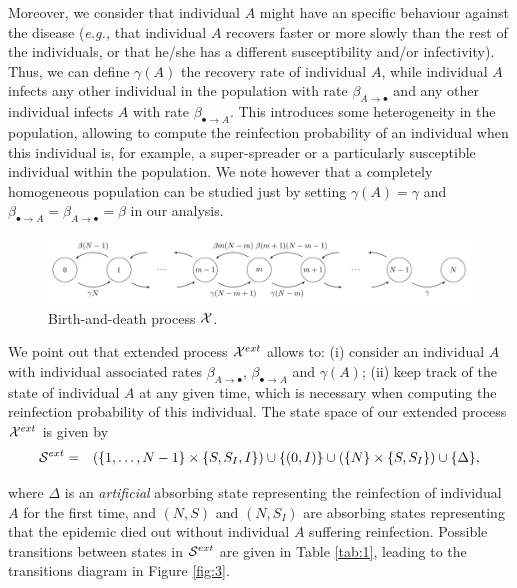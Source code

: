 \documentclass[preprint,12pt]{elsarticle}
\begin{document}
\par Moreover, we consider that individual $A$ might have an specific behaviour against the disease ({\it e.g.,} that individual $A$ recovers faster or
more slowly than the rest of the individuals, or that he/she has a different susceptibility and/or infectivity). Thus, we can define $\gamma(A)$ the recovery
rate of individual $A$, while individual $A$ infects any other individual in the population with rate $\beta_{A\rightarrow\bullet}$ and any other
individual infects $A$ with rate $\beta_{\bullet\rightarrow A}$. This introduces some heterogeneity in the population, allowing to compute the reinfection
probability of an individual when this individual is, for example, a super-spreader or a particularly susceptible individual within the population. We
note however that a completely homogeneous population can be studied just by setting $\gamma(A)=\gamma$ and $\beta_{\bullet\rightarrow A}=\beta_{A\rightarrow\bullet}=\beta$
in our analysis.
\begin{figure}
\centering
 \includegraphics[width=\textwidth]{Figure2.jpg}
\caption{Birth-and-death process ${\cal X}$.}
\label{fig:2}
\end{figure}

\par We point out that extended process ${\cal X}^{ext}$ allows to: (i) consider an individual $A$ with individual associated rates $\beta_{A\rightarrow\bullet}$,
$\beta_{\bullet\rightarrow A}$ and $\gamma(A)$; (ii) keep track of the state of individual $A$ at any given time, which is necessary when computing the
reinfection probability of this individual. The state space of our extended process ${\cal X}^{ext}$ is given by
\begin{eqnarray*}
 {\cal S}^{ext} &=& \left(\{1,\dots,N-1\}\times\{S,S_I,I\}\right)\cup\{(0,I)\}\cup\left(\{N\}\times\{S,S_I\}\right)\cup\{\Delta\},
\end{eqnarray*}

\par\noindent where $\Delta$ is an {\it artificial} absorbing state representing the reinfection of individual $A$ for the first time, and $(N,S)$
and $(N,S_I)$ are absorbing states representing that the epidemic died out without individual $A$ suffering reinfection. Possible transitions between
states in ${\cal S}^{ext}$ are given in Table \ref{tab:1}, leading to the transitions diagram in Figure \ref{fig:3}.
\end{document}
